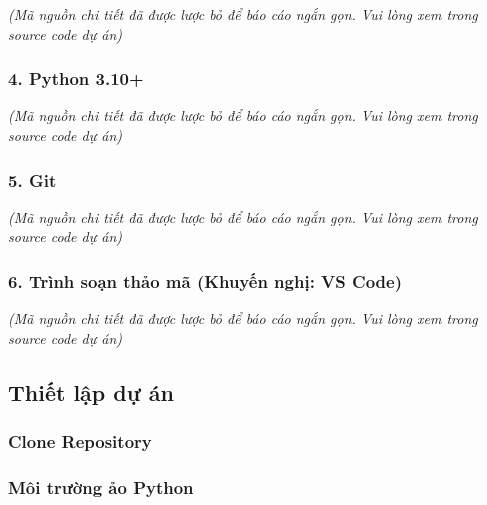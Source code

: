 \emph{(Mã nguồn chi tiết đã được lược bỏ để báo cáo ngắn gọn. Vui lòng
xem trong source code dự án)}

\hypertarget{python-3.10}{%
\subsubsection{4. Python 3.10+}}

\emph{(Mã nguồn chi tiết đã được lược bỏ để báo cáo ngắn gọn. Vui lòng
xem trong source code dự án)}

\hypertarget{git}{%
\subsubsection{5. Git}}

\emph{(Mã nguồn chi tiết đã được lược bỏ để báo cáo ngắn gọn. Vui lòng
xem trong source code dự án)}

\hypertarget{truxecnh-soux1ea1n-thux1ea3o-muxe3-khuyux1ebfn-nghux1ecb-vs-code}{%
\subsubsection{6. Trình soạn thảo mã (Khuyến nghị: VS
Code)}}

\emph{(Mã nguồn chi tiết đã được lược bỏ để báo cáo ngắn gọn. Vui lòng
xem trong source code dự án)}

\hypertarget{thiux1ebft-lux1eadp-dux1ef1-uxe1n}{%
\subsection{Thiết lập dự án}}

\hypertarget{clone-repository}{%
\subsubsection{Clone Repository}}

\begin{Shaded}
\begin{Highlighting}[]
\OperatorTok{\textless{}}\OperatorTok{\textgreater{}}
\end{Highlighting}
\end{Shaded}

\hypertarget{muxf4i-trux1b0ux1eddng-ux1ea3o-python}{%
\subsubsection{Môi trường ảo
Python}}

